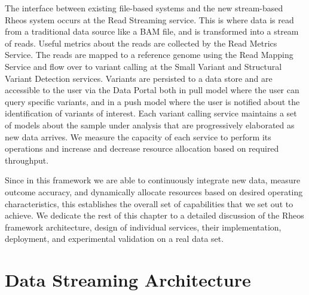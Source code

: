 The interface between existing file-based systems and the new stream-based Rheos system occurs at the Read Streaming service. This is where data is read from a traditional data source like a BAM file, and is transformed into a stream of reads. Useful metrics about the reads are collected by the Read Metrics Service. The reads are mapped to a reference genome using the Read Mapping Service and flow over to variant calling at the Small Variant and Structural Variant Detection services. Variants are persisted to a data store and are accessible to the user via the Data Portal both in pull model where the user can query specific variants, and in a push model where the user is notified about the identification of variants of interest. Each variant calling service maintains a set of models about the sample under analysis that are progressively elaborated as new data arrives. We measure the capacity of each service to perform its operations and increase and decrease resource allocation based on required throughput. 

Since in this framework we are able to continuously integrate new data, measure outcome accuracy, and dynamically allocate resources based on desired operating characteristics, this establishes the overall set of capabilities that we set out to achieve. We dedicate the rest of this chapter to a detailed discussion of the Rheos framework architecture, design of individual services, their implementation, deployment, and experimental validation on a real data set.


\section{Data Streaming Architecture}
\label{sec:rheos_streaming_architecture}

